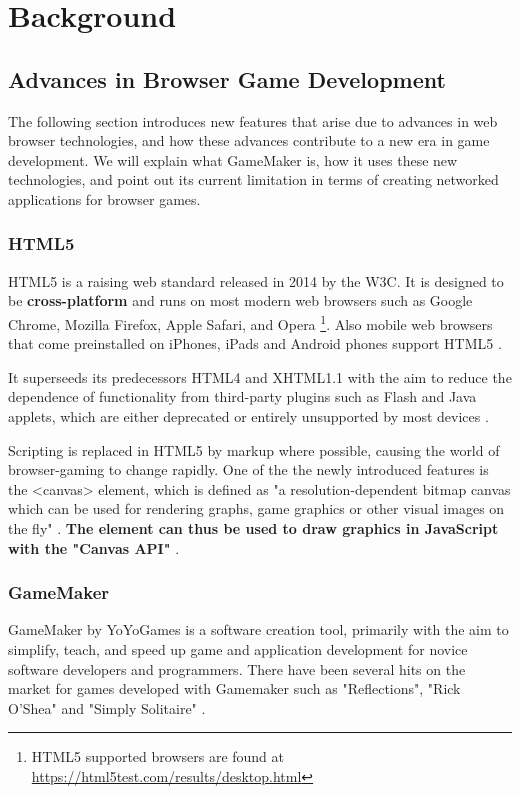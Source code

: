 \documentclass[bsc, 12pt, twoside, singlespacing, parskip, abbrevs, notimes, normalheadings, logo]{styles/infthesis}
\begin{document}
\chapter{Background}

\section{Advances in Browser Game Development}
The following section introduces new features that arise due to advances in web browser technologies, and how these advances contribute to a new era in game development. We will explain what GameMaker is, how it uses these new technologies, and point out its current limitation in terms of creating networked applications for browser games.

\subsection{HTML5}
HTML5 is a raising web standard released in 2014 by the W3C. It is designed to be \textbf{cross-platform} and runs on most modern web browsers such as Google Chrome, Mozilla Firefox, Apple Safari, and Opera \footnote{HTML5 supported browsers are found at \url{https://html5test.com/results/desktop.html}}. Also mobile web browsers that come preinstalled on iPhones, iPads and Android phones support HTML5 \cite{Pro_HTML5_Programming}.

It superseeds its predecessors HTML4 and XHTML1.1 with the aim to reduce the dependence of functionality from third-party plugins such as Flash and Java applets, which are either deprecated or entirely unsupported by most devices \cite{Death_Flash_Java}.

Scripting is replaced in HTML5 by markup where possible, causing the world of browser-gaming to change rapidly. One of the the newly introduced features is the <canvas> element, which is defined as "a resolution-dependent bitmap canvas which can be used for rendering graphs, game graphics or other visual images on the fly" \cite{HTML5_Up_and_Running}. \textbf{The element can thus be used to draw graphics in JavaScript with the "Canvas API"} \cite{Canvas_API}.

\subsection{GameMaker}
GameMaker by YoYoGames is a software creation tool, primarily with the aim to simplify, teach, and speed up game and application development for novice software developers and programmers. There have been several hits on the market for games developed with Gamemaker such as "Reflections", "Rick O'Shea" and "Simply Solitaire" \cite{Gamemaker_DnD}.
\end{document}
